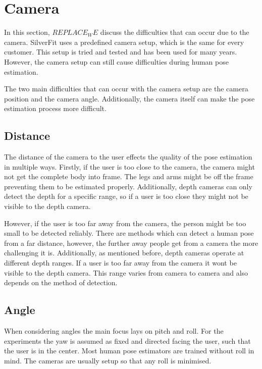 \section{Camera}

In this section, $REPLACE_WE$ discuss the difficulties that can occur due to the camera. SilverFit uses a predefined camera setup, which is the same for every customer. This setup is tried and tested and has been used for many years. However, the camera setup can still cause difficulties during human pose estimation.

The two main difficulties that can occur with the camera setup are the camera position and the camera angle. Additionally, the camera itself can make the pose estimation process more difficult.

\subsection{Distance}

The distance of the camera to the user effects the quality of the pose estimation in multiple ways. Firstly, if the user is too close to the camera, the camera might not get the complete body into frame. The legs and arms might be off the frame preventing them to be estimated properly. Additionally, depth cameras can only detect the depth for a specific range, so if a user is too close they might not be visible to the depth camera.

However, if the user is too far away from the camera, the person might be too small to be detected reliably. There are methods which can detect a human pose from a far distance, however, the further away people get from a camera the more challenging it is. Additionally, as mentioned before, depth cameras operate at different depth ranges. If a user is too far away from the camera it wont be visible to the depth camera. This range varies from camera to camera and also depends on the method of detection.

\subsection{Angle}

When considering angles the main focus lays on pitch and roll. For the experiments the yaw is assumed as fixed and directed facing the user, such that the user is in the center. Most human pose estimators are trained without roll in mind. The cameras are usually setup so that any roll is minimised.

